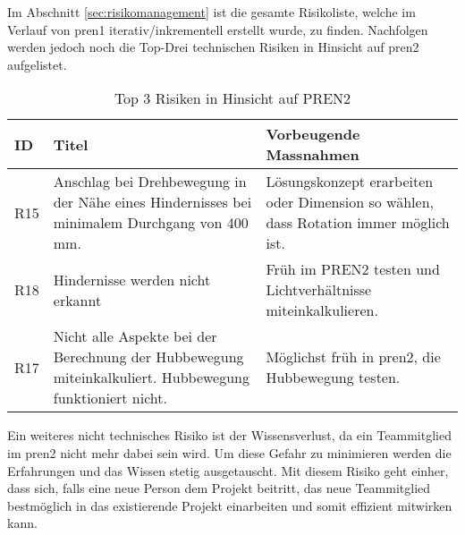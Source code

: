 Im Abschnitt \ref{sec:risikomanagement} ist die gesamte Risikoliste, welche im Verlauf von \acrshort{pren1} iterativ/inkrementell erstellt wurde, zu finden. Nachfolgen werden jedoch noch die Top-Drei technischen Risiken in Hinsicht auf \acrshort{pren2} aufgelistet.

\begin{center}
\begin{table}[H]
    \begin{tabularx}{\textwidth}{|l|X|X|}
        \hline
        \textbf{ID} & \textbf{Titel} & \textbf{Vorbeugende Massnahmen} \\ \hline
        R15 & Anschlag bei Drehbewegung in der Nähe eines Hindernisses bei minimalem Durchgang von 400 mm. & Lösungskonzept erarbeiten oder Dimension so wählen, dass Rotation immer möglich ist. \\ \hline
        R18 & Hindernisse werden nicht erkannt & Früh im PREN2 testen und Lichtverhältnisse miteinkalkulieren. \\ \hline
        R17 & Nicht alle Aspekte bei der Berechnung der Hubbewegung miteinkalkuliert. Hubbewegung funktioniert nicht. & Möglichst früh in \acrshort{pren2}, die Hubbewegung testen.\\ \hline
    \end{tabularx}
    \caption{Top 3 Risiken in Hinsicht auf PREN2}
    \label{tab:risikomanagement-ausblick}
\end{table}
\end{center}

Ein weiteres nicht technisches Risiko ist der Wissensverlust, da ein Teammitglied im \acrshort{pren2} nicht mehr dabei sein wird. Um diese Gefahr zu minimieren werden die Erfahrungen und das Wissen stetig ausgetauscht. Mit diesem Risiko geht einher, dass sich, falls eine neue Person dem Projekt beitritt, das neue Teammitglied bestmöglich in das existierende Projekt einarbeiten und somit effizient mitwirken kann.













